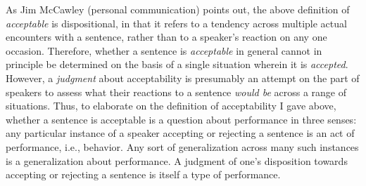As Jim McCawley (personal communication) points out, the above definition of \textit{acceptable} is dispositional, in that it refers to a tendency across multiple actual encounters with a sentence, rather than to a speaker's reaction on any one occasion. Therefore, whether a sentence is \textit{acceptable} in general cannot in principle be determined on the basis of a single situation wherein it is \textit{accepted}. However, a \textit{judgment} about acceptability is presumably an attempt on the part of speakers to assess what their reactions to a sentence \textit{would be} across a range of situations. Thus, to elaborate on the definition of acceptability I gave above, whether a sentence is acceptable is a question about performance in three senses: any particular instance of a speaker accepting or rejecting a sentence is an act of performance, i.e., behavior. Any sort of generalization across many such instances is a generalization about performance. A judgment of one's disposition towards accepting or rejecting a sentence is itself a type of performance.

